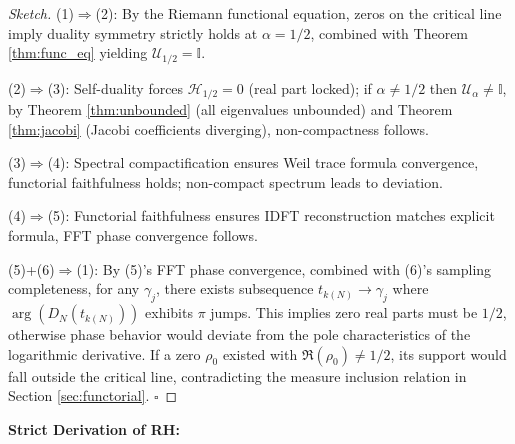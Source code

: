 \documentclass[12pt,a4paper]{amsart}
\theoremstyle{plain}
\theoremstyle{definition}
\theoremstyle{remark}
\begin{document}
\begin{proof}[Sketch]
(1)$\Rightarrow$(2): By the Riemann functional equation, zeros on the critical line imply duality symmetry strictly holds at $\alpha=1/2$, combined with Theorem \ref{thm:func_eq} yielding $\mathcal{U}_{1/2}=\mathbb{I}$.

(2)$\Rightarrow$(3): Self-duality forces $\mathcal{H}_{1/2}=0$ (real part locked); if $\alpha\neq 1/2$ then $\mathcal{U}_\alpha\neq\mathbb{I}$, by Theorem \ref{thm:unbounded} (all eigenvalues unbounded) and Theorem \ref{thm:jacobi} (Jacobi coefficients diverging), non-compactness follows.

(3)$\Rightarrow$(4): Spectral compactification ensures Weil trace formula convergence, functorial faithfulness holds; non-compact spectrum leads to deviation.

(4)$\Rightarrow$(5): Functorial faithfulness ensures IDFT reconstruction matches explicit formula, FFT phase convergence follows.

(5)+(6)$\Rightarrow$(1): By (5)'s FFT phase convergence, combined with (6)'s sampling completeness, for any $\gamma_j$, there exists subsequence $t_{k(N)} \to \gamma_j$ where $\arg(D_N(t_{k(N)}))$ exhibits $\pi$ jumps. This implies zero real parts must be $1/2$, otherwise phase behavior would deviate from the pole characteristics of the logarithmic derivative. If a zero $\rho_0$ existed with $\Re(\rho_0)\neq 1/2$, its support would fall outside the critical line, contradicting the measure inclusion relation in Section \ref{sec:functorial}. $\square$
\end{proof}

\textbf{Strict Derivation of RH:}
\end{document}

